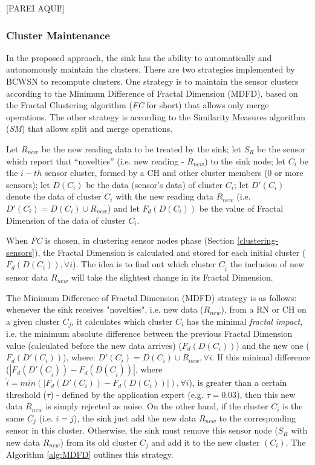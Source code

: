 \documentclass{acm_proc_article-sp}
\begin{document}
[PAREI AQUI!]

\subsubsection{Cluster Maintenance}
\label{cluster-maintenance}

In the proposed approach, the sink has the ability to automatically and
autonomously maintain the clusters. There are two strategies implemented by
BCWSN to recompute clusters. One strategy is to maintain the sensor clusters
according to the Minimum Difference of Fractal Dimension (MDFD), based on the
Fractal Clustering algorithm (\textit{FC} for short) that allows only
merge operations. The other strategy is according to the Similarity
Measures algorithm (\textit{SM}) that allows split and merge operations.

Let $R_{new}$ be the new reading data to be treated by the sink; let $S_{R}$ be
the sensor which report that ``novelties'' (i.e. new reading - $R_{new}$) to the
sink node; let $C_i$ be the $i-th$ sensor cluster, formed by a 
CH and other cluster members (0 or more sensors); let $D(C_i)$
be the data (sensor's data) of cluster $C_i$; let $D'(C_i)$ denote the data of
cluster $C_i$ with the new reading data $R_{new}$ (i.e. $D'(C_i) = D(C_i) \cup
R_{new}$) and let $F_{d}(D(C_i))$ be the value of Fractal Dimension of the data
of cluster $C_i$.

When \textit{FC} is chosen, in clustering sensor nodes phase (Section
\ref{clustering-sensors}), the Fractal Dimension is calculated and stored for
each initial cluster ($F_{d}(D(C_i)), \forall i$). The idea is to find out which
cluster $C_{\hat{i}}$ the inclusion of new sensor data $R_{new}$ will take the
slightest change in its Fractal Dimension.

The Minimum Difference of Fractal Dimension (MDFD) strategy is as follows:
whenever the sink receives "novelties", i.e. new data ($R_{new}$), from a RN or CH on
a given cluster $C_j$, it calculates which cluster $C_i$ has the minimal
\textit{fractal impact}, i.e. the minimum absolute difference between the
previous Fractal Dimension value (calculated before the new data arrives)
($F_d(D(C_i))$) and the new one ($F_d(D'(C_i))$), where: $D'(C_i) = D(C_i) \cup
R_{new}, \forall i$.
If this minimal difference ($|F_d(D'(C_{\hat{i}})) - F_d(D(C_{\hat{i}}))|$,
where $\hat{i} = min(|F_d(D'(C_i)) - F_d(D(C_i))|), \forall i$), is greater than
a certain threshold ($\tau$) - defined by the application expert (e.g. $\tau =
0.03$), then this new data $R_{new}$ is simply rejected as noise.
On the other hand, if the cluster $C_i$ is the same $C_j$ (i.e. $i=j$), the
sink just add the new data $R_{new}$ to the corresponding sensor in this cluster.
Otherwise, the sink must remove this sensor node ($S_{R}$ with new data
$R_{new}$) from its old cluster $C_j$ and add it to the new cluster $(C_i)$.
The Algorithm \ref{alg:MDFD} outlines this strategy.
\end{document}
